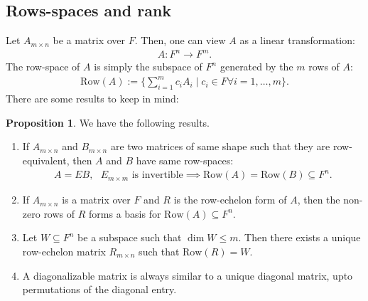 \documentclass[letterpaper,11pt,twoside]{article}
\theoremstyle{definition}
\newtheorem{proposition}{Proposition}[subsection]
\theoremstyle{definition}
\theoremstyle{definition}
\theoremstyle{definition}
\theoremstyle{definition}
\theoremstyle{definition}
\theoremstyle{remark}
\theoremstyle{definition}
\newcommand{\row}[1]{\text{Row}\left(#1\right)}
\begin{document}
	\subsection{Rows-spaces and rank}
	Let $A_{m\times n}$ be a matrix over $F$. Then, one can view $A$ as a linear transformation:
	\begin{align*}
	    A: F^n \to F^m.
	\end{align*}
	The row-space of $A$ is simply the subspace of $F^n$ generated by the $m$ rows of $A$:
	\begin{align*}
	    \row{A} := \{\sum_{i=1}^m c_i A_i\;\vert\; c_i \in F \forall i=1,\dots,m\}.
	\end{align*}
	There are some results to keep in mind:
	\begin{proposition}
	    We have the following results.
	    \begin{enumerate}
	        \item {If $A_{m\times n}$ and $B_{m\times n}$ are two matrices of same shape such that they are row-equivalent, then $A$ and $B$ have same row-spaces:
	        \begin{align*}
	            A= EB, \text{ $E_{m\times m}$ is invertible}  \implies \row{A} = \row{B} \subseteq F^n.
	        \end{align*}
	        }
	        \item{If $A_{m\times n}$ is a matrix over $F$ and $R$ is the row-echelon form of $A$, then the non-zero rows of $R$ forms a basis for $\row{A} \subseteq F^n$.}
	        \item {Let $W \subseteq F^n$ be a subspace such that $\dim W \le m$. Then there exists a unique row-echelon matrix $R_{m\times n}$ such that $\row{R} = W$.}
	        \item {A diagonalizable matrix is always similar to a unique diagonal matrix, upto permutations of the diagonal entry.}
	    \end{enumerate}
	\end{proposition}
\end{document}
